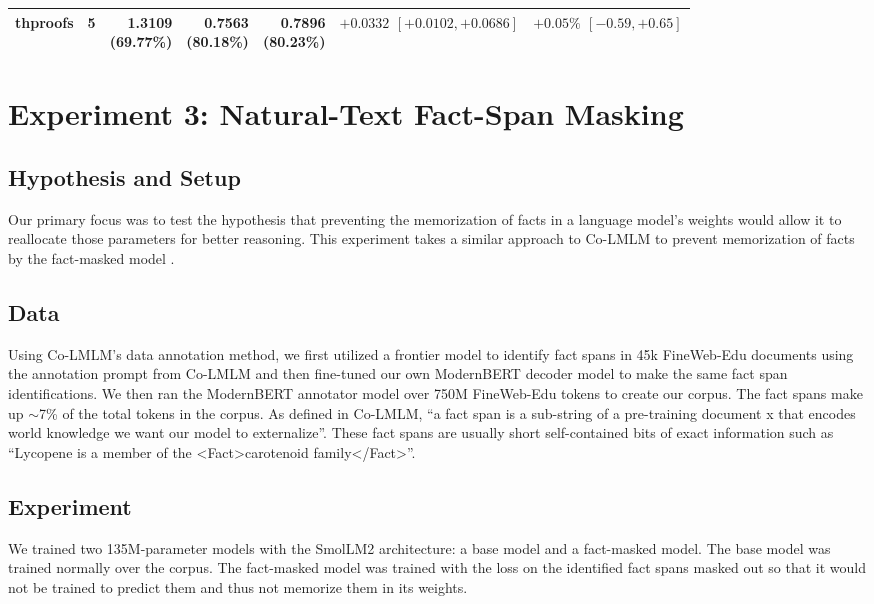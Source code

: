 \documentclass{article}
\begin{document}
\begin{table}[!htbp]
{\begin{tabular}{lrrrrrr}
thproofs & 5   & \shortstack{1.3109\\(69.77\%)} & \shortstack{0.7563\\(80.18\%)} & \shortstack{0.7896\\(80.23\%)} & \shortstack{$+0.0332$\\$[+0.0102,+0.0686]$} & \shortstack{$+0.05\%$\\$[-0.59,+0.65]$} \\
\bottomrule
\end{tabular}%
}
\end{table}

\section{Experiment 3: Natural-Text Fact-Span Masking}

\subsection{Hypothesis and Setup}
Our primary focus was to test the hypothesis that preventing the memorization of facts in a language model's weights would allow it to reallocate those parameters for better reasoning. This experiment takes a similar approach to Co-LMLM to prevent memorization of facts by the fact-masked model \citep{feldman2026colmlm}.

\subsection{Data}
Using Co-LMLM's data annotation method, we first utilized a frontier model to identify fact spans in 45k FineWeb-Edu documents using the annotation prompt from Co-LMLM and then fine-tuned our own ModernBERT decoder model to make the same fact span identifications. We then ran the ModernBERT annotator model over 750M FineWeb-Edu tokens to create our corpus. The fact spans make up $\sim$7\% of the total tokens in the corpus. As defined in Co-LMLM,
``a fact span is a sub-string of a pre-training document x that encodes world knowledge we want our model to externalize''. These fact spans are usually short self-contained bits of exact information such as ``Lycopene is a member of the <Fact>carotenoid family</Fact>''.

\subsection{Experiment}
We trained two 135M-parameter models with the SmolLM2 architecture: a base model and a fact-masked model. The base model was trained normally over the corpus. The fact-masked model was trained with the loss on the identified fact spans masked out so that it would not be trained to predict them and thus not memorize them in its weights.
\end{document}
